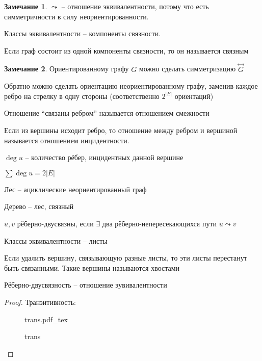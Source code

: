 \documentclass{book}
\theoremstyle{definition}
\newtheorem*{note}{Замечание}
\newcommand{\incfig}[1]{%
    \def\svgwidth{\columnwidth}
    {#1.pdf_tex}
}
\begin{document}
    \begin{note}
        $\leadsto$ -- отношение эквивалентности, потому что есть симметричности в силу неориентированности.

        Классы эквивалентности -- компоненты связности.

        Если граф состоит из одной компоненты связности, то он называется связным
    \end{note}

    \begin{note}
        Ориентированному графу $G$ можно сделать симметризацию  $\overset{\leftrightarrow} G$

        Обратно можно сделать ориентацию неориентированному графу, заменив каждое ребро на стрелку в одну стороны (соответственно  $2^{|E|}$ ориентаций)
    \end{note}

    \begin{definition}
        Отношение ``связаны ребром'' называется отношением смежности

        Если из вершины исходит ребро, то отношение между ребром и вершиной называется отношением инцидентности.

        $\deg u$ -- количество рёбер, инцидентных данной вершине
    \end{definition}

    \begin{lemma}
        [о рукопожатиях] $\sum \deg u = 2|E|$
    \end{lemma}

    \begin{definition}
        Лес -- ациклические неориентированный граф

        Дерево -- лес, связный 
    \end{definition}

    \begin{definition}
        $u, v$ рёберно-двусвязны, если  $\exists $ два рёберно-непересекающихся пути $u\leadsto v$

        Классы эквивалентности -- листы

        Если удалить вершину, связывающую разные листы, то эти листы перестанут быть связанными. Такие вершины называются хвостами 
    \end{definition}

    \begin{theorem}
        Рёберно-двусвязность -- отношение эувивалентности
    \end{theorem}
    \begin{proof}
        Транзитивность: 

\begin{figure}[!ht]
    \centering
    \incfig{trans}
    \caption{trans}
    \label{fig:trans}
\end{figure}
    \end{proof}
\end{document}
